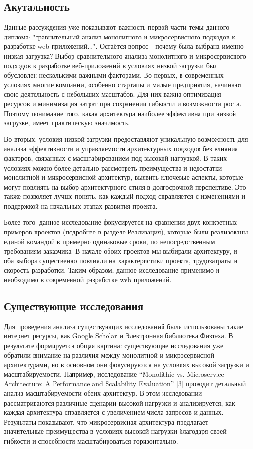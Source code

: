 \subsection{Акутальность}
    
    Данные рассуждения уже показывают важность первой части темы данного диплома: "сравнительный анализ монолитного и микросервисного подходов к разработке web приложений...". Остаётся вопрос - почему была выбрана именно низкая загрузка? Выбор сравнительного анализа монолитного и микросервисного подходов к разработке веб-приложений в условиях низкой загрузки был обусловлен несколькими важными факторами. Во-первых, в современных условиях многие компании, особенно стартапы и малые предприятия, начинают свою деятельность с небольших масштабов. Для них важна оптимизация ресурсов и минимизация затрат при сохранении гибкости и возможности роста. Поэтому понимание того, какая архитектура наиболее эффективна при низкой загрузке, имеет практическую значимость.

    Во-вторых, условия низкой загрузки предоставляют уникальную возможность для анализа эффективности и управляемости архитектурных подходов без влияния факторов, связанных с масштабированием под высокой нагрузкой. В таких условиях можно более детально рассмотреть преимущества и недостатки монолитной и микросервисной архитектур, выявить ключевые аспекты, которые могут повлиять на выбор архитектурного стиля в долгосрочной перспективе. Это также позволяет лучше понять, как каждый подход справляется с изменениями и поддержкой на начальных этапах развития проекта.

    Более того, данное исследование фокусируется на сравнении двух конкретных примеров проектов (подробнее в разделе Реализация), которые были реализованы единой командой в примерно одинаковые сроки, по непосредственным требованиям заказчика. В начале обоих проектов мы выбирали архитектуру, и оба выбора существенно повлияли на характеристики проекта, трудозатраты и скорость разработки. Таким образом, данное исследование применимо и необходимо в современной разработке web приложений.

\subsection{Существующие исследования}
    Для проведения анализа существующих исследований были использованы такие интернет ресурсы, как Google Scholar и Электронная библиотека Физтеха. В результате формируется общая картина: существующие исследования уже обратили внимание на различия между монолитной и микросервисной архитектурами, но в основном они фокусируются на условиях высокой загрузки и масштабируемости. Например, исследование “Monolithic vs. Microservice Architecture: A Performance and Scalability Evaluation” [3] проводит детальный анализ масштабируемости обеих архитектур. В этом исследовании рассматриваются различные сценарии высокой нагрузки и анализируется, как каждая архитектура справляется с увеличением числа запросов и данных. Результаты показывают, что микросервисная архитектура предлагает значительные преимущества в условиях высокой нагрузки благодаря своей гибкости и способности масштабироваться горизонтально.

